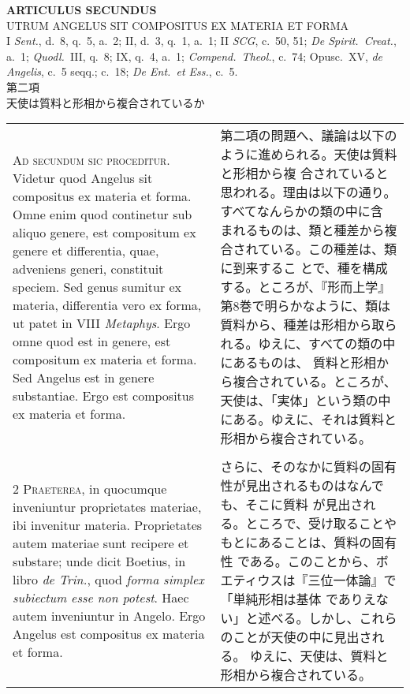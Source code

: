\documentclass[10pt]{jsarticle} %
\begin{document}
\begin{center}
 {\Large {\bf ARTICULUS SECUNDUS}}\\
 {\large UTRUM ANGELUS SIT COMPOSITUS EX MATERIA ET FORMA}\\
 {\footnotesize I {\itshape Sent.}, d.~8, q.~5, a.~2; II, d.~3, q.~1,
 a.~1; II {\itshape SCG}, c.~50, 51; {\itshape De Spirit.~Creat.}, a.~1;
 {\itshape Quodl.}~III, q.~8; IX, q.~4, a.~1; {\itshape
 Compend.~Theol.}, c.~74; Opusc.~XV, {\itshape de Angelis}, c.~5 seqq.;
 c.~18; {\itshape De Ent.~et Ess.}, c.~5.}\\
 {\Large 第二項\\天使は質料と形相から複合されているか}
\end{center}

\begin{longtable}{p{21em}p{21em}}

 {\huge A}{\scshape d secundum sic proceditur}. Videtur quod Angelus
 sit compositus ex materia et forma. Omne enim quod continetur sub
 aliquo genere, est compositum ex genere et differentia, quae,
 adveniens generi, constituit speciem. Sed genus sumitur ex materia,
 differentia vero ex forma, ut patet in VIII {\itshape Metaphys}. Ergo
 omne quod est in genere, est compositum ex materia et forma. Sed
 Angelus est in genere substantiae. Ergo est compositus ex materia et
 forma.


&

 第二項の問題へ、議論は以下のように進められる。天使は質料と形相から複
 合されていると思われる。理由は以下の通り。すべてなんらかの類の中に含
 まれるものは、類と種差から複合されている。この種差は、類に到来するこ
 とで、種を構成する。ところが、『形而上学』第8巻で明らかなように、類は
 質料から、種差は形相から取られる。ゆえに、すべての類の中にあるものは、
 質料と形相から複合されている。ところが、天使は、「実体」という類の中
 にある。ゆえに、それは質料と形相から複合されている。

\\\\

 {\scshape 2 Praeterea}, in quocumque inveniuntur proprietates
 materiae, ibi invenitur materia. Proprietates autem materiae sunt
 recipere et substare; unde dicit Boetius, in libro {\itshape de
 Trin.}, quod {\itshape forma simplex subiectum esse non potest}. Haec
 autem inveniuntur in Angelo. Ergo Angelus est compositus ex materia
 et forma.

 &

 さらに、そのなかに質料の固有性が見出されるものはなんでも、そこに質料
 が見出される。ところで、受け取ることやもとにあることは、質料の固有性
 である。このことから、ボエティウスは『三位一体論』で「単純形相は基体
 でありえない」と述べる。しかし、これらのことが天使の中に見出される。
 ゆえに、天使は、質料と形相から複合されている。


\end{longtable}
\end{document}
